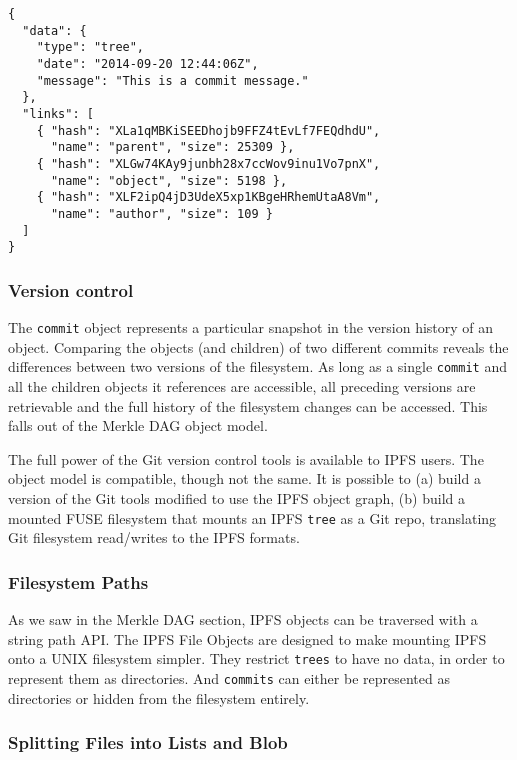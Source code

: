 \documentclass{sig-alternate}
\begin{document}
\begin{verbatim}
{
  "data": {
    "type": "tree",
    "date": "2014-09-20 12:44:06Z",
    "message": "This is a commit message."
  },
  "links": [
    { "hash": "XLa1qMBKiSEEDhojb9FFZ4tEvLf7FEQdhdU",
      "name": "parent", "size": 25309 },
    { "hash": "XLGw74KAy9junbh28x7ccWov9inu1Vo7pnX",
      "name": "object", "size": 5198 },
    { "hash": "XLF2ipQ4jD3UdeX5xp1KBgeHRhemUtaA8Vm",
      "name": "author", "size": 109 }
  ]
}
\end{verbatim}

\subsubsection{Version control}

The \texttt{commit} object represents a particular snapshot in the version
history of an object. Comparing the objects (and children) of two
different commits reveals the differences between two versions of the
filesystem. As long as a single \texttt{commit} and all the children objects
it references are accessible, all preceding versions are retrievable and the
full history of the filesystem changes can be accessed. This falls out
of the Merkle DAG object model.

The full power of the Git version control tools is available to IPFS users. The object model is compatible, though not the same. It is possible to (a) build a version of the Git tools modified to use the IPFS object graph, (b) build a mounted FUSE filesystem that mounts an IPFS \texttt{tree} as a Git repo, translating Git filesystem read/writes to the IPFS formats.


\subsubsection{Filesystem Paths}

As we saw in the Merkle DAG section, IPFS objects can be traversed with a string path API. The IPFS File Objects are designed to make mounting IPFS onto a UNIX filesystem simpler. They restrict \texttt{trees} to have no data, in order to represent them as directories. And \texttt{commits} can either be represented as directories or hidden from the filesystem entirely.

\subsubsection{Splitting Files into Lists and Blob}
\end{document}
